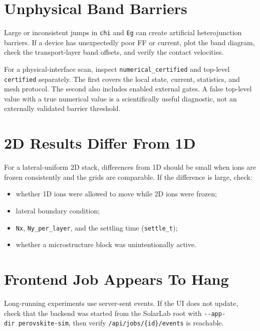 \documentclass[
  11pt,
  american,
]{report}
\providecommand{\tightlist}{%
  \setlength{\itemsep}{0pt}\setlength{\parskip}{0pt}}
\begin{document}
\hypertarget{unphysical-band-barriers}{%
\section{Unphysical Band Barriers}\label{unphysical-band-barriers}}

Large or inconsistent jumps in \texttt{chi} and \texttt{Eg} can create
artificial heterojunction barriers. If a device has unexpectedly poor FF
or current, plot the band diagram, check the transport-layer band
offsets, and verify the contact velocities.

For a physical-interface scan, inspect \texttt{numerical\_certified} and
top-level \texttt{certified} separately. The first covers the local
state, current, statistics, and mesh protocol. The second also includes
enabled external gates. A false top-level value with a true numerical
value is a scientifically useful diagnostic, not an externally validated
barrier threshold.

\hypertarget{d-results-differ-from-1d}{%
\section{2D Results Differ From 1D}\label{d-results-differ-from-1d}}

For a lateral-uniform 2D stack, differences from 1D should be small when
ions are frozen consistently and the grids are comparable. If the
difference is large, check:

\begin{itemize}
\tightlist
\item
  whether 1D ions were allowed to move while 2D ions were frozen;
\item
  lateral boundary condition;
\item
  \texttt{Nx}, \texttt{Ny\_per\_layer}, and the settling time
  (\texttt{settle\_t});
\item
  whether a microstructure block was unintentionally active.
\end{itemize}

\hypertarget{frontend-job-appears-to-hang}{%
\section{Frontend Job Appears To
Hang}\label{frontend-job-appears-to-hang}}

Long-running experiments use server-sent events. If the UI does not
update, check that the backend was started from the SolarLab root with
\texttt{-\/-app-dir\ perovskite-sim}, then verify
\texttt{/api/jobs/\{id\}/events} is reachable.
\end{document}
